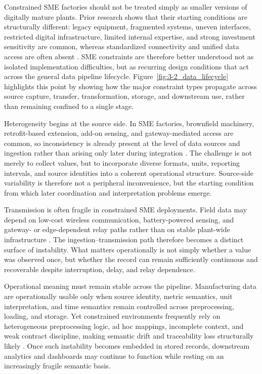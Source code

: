 \documentclass[systems,article,submit,pdftex,moreauthors]{Definitions/mdpi}
\begin{document}
Constrained SME factories should not be treated simply as smaller versions of digitally mature plants. Prior research shows that their starting conditions are structurally different: legacy equipment, fragmented systems, uneven interfaces, restricted digital infrastructure, limited internal expertise, and strong investment sensitivity are common, whereas standardized connectivity and unified data access are often absent \cite{mittal2018maturity, mittal2020adoption, ghobakhloo2019adoption, krishnan2024challenges, rauch2019requirements}. SME constraints are therefore better understood not as isolated implementation difficulties, but as recurring design conditions that act across the general data pipeline lifecycle. Figure~\ref{fig:3-2_data_lifecycle} highlights this point by showing how the major constraint types propagate across source capture, transfer, transformation, storage, and downstream use, rather than remaining confined to a single stage.

Heterogeneity begins at the source side. In SME factories, brownfield machinery, retrofit-based extension, add-on sensing, and gateway-mediated access are common, so inconsistency is already present at the level of data sources and ingestion rather than arising only later during integration \cite{alqoud2022legacy, etz2020retrofit, tran2022retrofitting, park2019opcua}. The challenge is not merely to collect values, but to incorporate diverse formats, units, reporting intervals, and source identities into a coherent operational structure. Source-side variability is therefore not a peripheral inconvenience, but the starting condition from which later coordination and interpretation problems emerge.

Transmission is often fragile in constrained SME deployments. Field data may depend on low-cost wireless communication, battery-powered sensing, and gateway- or edge-dependent relay paths rather than on stable plant-wide infrastructure \cite{gao2019connectivity, noor2023wireless, hawkridge2019tying}. The ingestion--transmission path therefore becomes a distinct surface of instability. What matters operationally is not simply whether a value was observed once, but whether the record can remain sufficiently continuous and recoverable despite interruption, delay, and relay dependence.

Operational meaning must remain stable across the pipeline. Manufacturing data are operationally usable only when source identity, metric semantics, unit interpretation, and time semantics remain controlled across preprocessing, loading, and storage. Yet constrained environments frequently rely on heterogeneous preprocessing logic, ad hoc mappings, incomplete context, and weak contract discipline, making semantic drift and traceability loss structurally likely \cite{pereira2021towards, nagorny2020rami, hildebrandt2020ontology, westermann2022accessing, morris2020foundations}. Once such instability becomes embedded in stored records, downstream analytics and dashboards may continue to function while resting on an increasingly fragile semantic basis.
\end{document}
